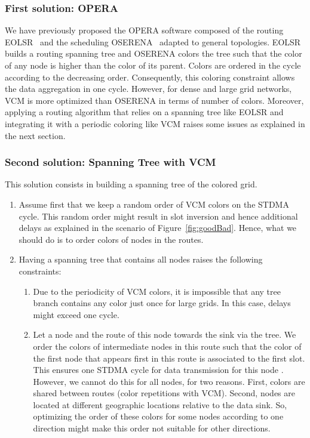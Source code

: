 \subsubsection{First solution: OPERA~\cite{operaSite}}
We have previously proposed the OPERA software composed of the routing EOLSR~\cite{operaSite} and the scheduling OSERENA~\cite{oserena} adapted to general topologies. EOLSR builds a routing spanning tree and OSERENA colors the tree such that the color of any node is higher than the color of its parent. Colors are ordered in the cycle according to the decreasing order. Consequently, this coloring constraint allows the data aggregation in one cycle. However, for dense and large grid networks, VCM is more optimized than OSERENA in terms of number of colors. 
Moreover, applying a routing algorithm that relies on a spanning tree like EOLSR and integrating it with a periodic coloring like VCM raises some issues as explained in the next section.

\subsubsection{Second solution: Spanning Tree with VCM}
This solution consists in building a spanning tree of the colored grid.
\begin{enumerate}
\item Assume first that we keep a random order of VCM colors on the STDMA cycle. This random order might result in slot inversion and hence additional delays as explained in the scenario of Figure~\ref{fig:goodBad}. Hence, what we should do is to order colors of nodes in the routes.
\item Having a spanning tree that contains all nodes raises the following constraints:
\begin{enumerate}
\item Due to the periodicity of VCM colors, it is impossible that any tree branch contains any color just once for large grids. In this case, delays might exceed one cycle.
\item Let a node  and the route of this node towards the sink via the tree. We order the colors of intermediate nodes in this route such that the color of the first node that appears first in this route is associated to the first slot.
This ensures one STDMA cycle for data transmission for this node . However, we cannot do this for all nodes, for two reasons. First, colors are shared between routes (color repetitions with VCM). Second, nodes are located at different geographic locations relative to the data sink. So, optimizing the order of these colors for some nodes according to one direction might make this order not suitable for other directions. 
\end{enumerate}
\end{enumerate}
 
